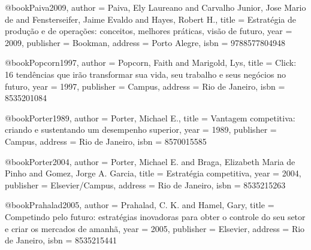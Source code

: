 @book{Paiva2009,
  author = {Paiva, Ely Laureano and Carvalho Junior, Jose Mario de and Fensterseifer, Jaime Evaldo and Hayes, Robert H.},
  title = {Estratégia de produção e de operações: conceitos, melhores práticas, visão de futuro},
  year = {2009},
  publisher = {Bookman},
  address = {Porto Alegre},
  isbn = {9788577804948}
}

@book{Popcorn1997,
  author = {Popcorn, Faith and Marigold, Lys},
  title = {Click: 16 tendências que irão transformar sua vida, seu trabalho e seus negócios no futuro},
  year = {1997},
  publisher = {Campus},
  address = {Rio de Janeiro},
  isbn = {8535201084}
}

@book{Porter1989,
  author = {Porter, Michael E.},
  title = {Vantagem competitiva: criando e sustentando um desempenho superior},
  year = {1989},
  publisher = {Campus},
  address = {Rio de Janeiro},
  isbn = {8570015585}
}

@book{Porter2004,
  author = {Porter, Michael E. and Braga, Elizabeth Maria de Pinho and Gomez, Jorge A. Garcia},
  title = {Estratégia competitiva},
  year = {2004},
  publisher = {Elsevier/Campus},
  address = {Rio de Janeiro},
  isbn = {8535215263}
}

@book{Prahalad2005,
  author = {Prahalad, C. K. and Hamel, Gary},
  title = {Competindo pelo futuro: estratégias inovadoras para obter o controle do seu setor e criar os mercados de amanhã},
  year = {2005},
  publisher = {Elsevier},
  address = {Rio de Janeiro},
  isbn = {8535215441}
}


